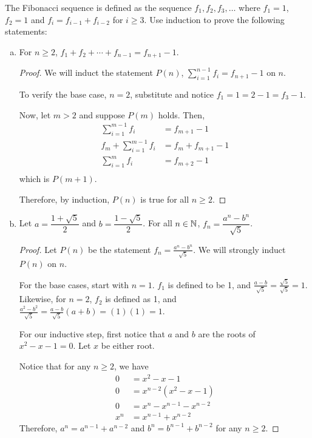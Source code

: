 \question The Fibonacci sequence is defined as the sequence $f_1, f_2, f_3, \dots$
where $f_1=1$, $f_2=1$ and $f_i=f_{i-1}+f_{i-2}$ for $i \geq 3$.
Use induction to prove the following statements:
\begin{enumerate}[(a)]
  \item For $n \geq 2$, $f_1 + f_2 + \cdots + f_{n-1} = f_{n+1} - 1$.
        \begin{proof}
          We will induct the statement $P(n)$, $\sum_{i=1}^{n-1} f_i = f_{n+1}-1$ on $n$.

          To verify the base case, $n = 2$, substitute and notice $f_1 = 1 = 2-1 = f_3-1$.

          Now, let $m > 2$ and suppose $P(m)$ holds. Then,
          \begin{align*}
            \sum_{i=1}^{m-1} f_i       & = f_{m+1}-1         \\
            f_m + \sum_{i=1}^{m-1} f_i & = f_m + f_{m+1} - 1 \\
            \sum_{i=1}^{m} f_i         & = f_{m+2}-1         \\
          \end{align*}
          which is $P(m+1)$.

          Therefore, by induction, $P(n)$ is true for all $n \geq 2$.
        \end{proof}
  \item Let $a = \dfrac{1+\sqrt{5}}{2}$ and $b = \dfrac{1-\sqrt{5}}{2}$.
        For all $n\in\mathbb{N}$, $f_n = \dfrac{a^n-b^n}{\sqrt{5}}$.
        \begin{proof}
          Let $P(n)$ be the statement $f_n = \frac{a^n-b^n}{\sqrt{5}}$.
          We will strongly induct $P(n)$ on $n$.

          For the base cases, start with $n=1$.
          $f_1$ is defined to be 1, and $\frac{a-b}{\sqrt{5}} = \frac{\sqrt{5}}{\sqrt{5}} = 1$.
          Likewise, for $n=2$, $f_2$ is defined as 1, and
          $\frac{a^2-b^2}{\sqrt{5}}=\frac{a-b}{\sqrt{5}}(a+b)=(1)(1)=1$.

          For our inductive step, first notice that $a$ and $b$ are the roots of $x^2-x-1=0$.
          Let $x$ be either root.

          Notice that for any $n \geq 2$, we have
          \begin{align*}
            0   & = x^2-x-1                 \\
            0   & = x^{n-2}(x^2-x-1)        \\
            0   & = x^n - x^{n-1} - x^{n-2} \\
            x^n & = x^{n-1} + x^{n-2}
          \end{align*}
          Therefore, $a^n = a^{n-1}+a^{n-2}$ and $b^n = b^{n-1}+b^{n-2}$ for any $n \geq 2$.


\end{proof}
\end{enumerate}
